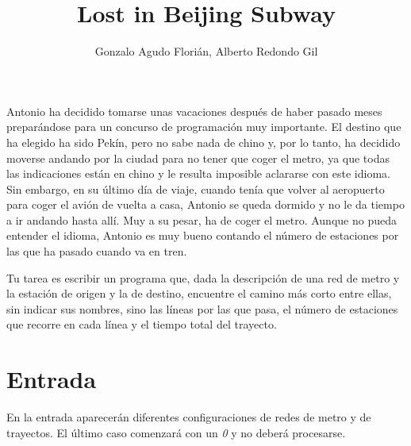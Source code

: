 \documentclass[a4paper]{article}
\title{Lost in Beijing Subway}
\author{Gonzalo Agudo Florián, Alberto Redondo Gil}
\date{}
\begin{document}
\maketitle

Antonio ha decidido tomarse unas vacaciones después de haber pasado meses preparándose para un concurso de programación muy importante. El destino que ha elegido ha sido Pekín, pero no sabe nada de chino y, por lo tanto, ha decidido moverse andando por la ciudad para no tener que coger el metro, ya que todas las indicaciones están en chino y le resulta imposible aclararse con este idioma. Sin embargo, en su último día de viaje, cuando tenía que volver al aeropuerto para coger el avión de vuelta a casa, Antonio se queda dormido y no le da tiempo a ir andando hasta allí. Muy a su pesar, ha de coger el metro. Aunque no pueda entender el idioma, Antonio es muy bueno contando el número de estaciones por las que ha pasado cuando va en tren.

Tu tarea es escribir un programa que, dada la descripción de una red de metro y la estación de origen y la de destino, encuentre el camino más corto entre ellas, sin indicar sus nombres, sino las líneas por las que pasa, el número de estaciones que recorre en cada línea y el tiempo total del trayecto.

\section*{Entrada}

En la entrada aparecerán diferentes configuraciones de redes de metro y de trayectos. El último caso comenzará con un \textit{0} y no deberá procesarse.
\end{document}
